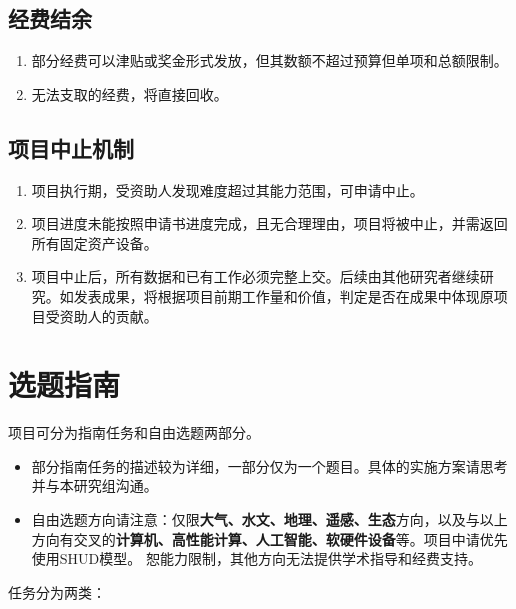 \documentclass[
]{book}
\providecommand{\tightlist}{%
  \setlength{\itemsep}{0pt}\setlength{\parskip}{0pt}}
\begin{document}
\hypertarget{ux7ecfux8d39ux7ed3ux4f59}{%
\section{经费结余}\label{ux7ecfux8d39ux7ed3ux4f59}}

\begin{enumerate}
\def\labelenumi{\arabic{enumi}.}
\tightlist
\item
  部分经费可以津贴或奖金形式发放，但其数额不超过预算但单项和总额限制。
\item
  无法支取的经费，将直接回收。
\end{enumerate}

\hypertarget{ux9879ux76eeux4e2dux6b62ux673aux5236}{%
\section{项目中止机制}\label{ux9879ux76eeux4e2dux6b62ux673aux5236}}

\begin{enumerate}
\def\labelenumi{\arabic{enumi}.}
\tightlist
\item
  项目执行期，受资助人发现难度超过其能力范围，可申请中止。
\item
  项目进度未能按照申请书进度完成，且无合理理由，项目将被中止，并需返回所有固定资产设备。
\item
  项目中止后，所有数据和已有工作必须完整上交。后续由其他研究者继续研究。如发表成果，将根据项目前期工作量和价值，判定是否在成果中体现原项目受资助人的贡献。
\end{enumerate}

\hypertarget{ux9009ux9898ux6307ux5357}{%
\chapter{选题指南}\label{ux9009ux9898ux6307ux5357}}

项目可分为指南任务和自由选题两部分。

\begin{itemize}
\tightlist
\item
  部分指南任务的描述较为详细，一部分仅为一个题目。具体的实施方案请思考并与本研究组沟通。
\item
  自由选题方向请注意：仅限\textbf{大气、水文、地理、遥感、生态}方向，以及与以上方向有交叉的\textbf{计算机、高性能计算、人工智能、软硬件设备}等。项目中请优先使用SHUD模型。
  恕能力限制，其他方向无法提供学术指导和经费支持。
\end{itemize}

任务分为两类：
\end{document}
